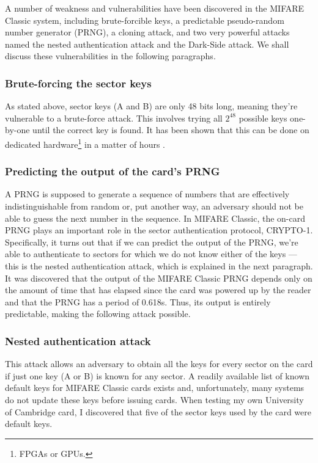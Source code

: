\documentclass[12pt,a4paper,twoside,openright]{report}
\begin{document}
A number of weakness and vulnerabilities have been discovered in the MIFARE Classic system, including brute-forcible keys, a predictable pseudo-random number generator (PRNG), a cloning attack, and two very powerful attacks named the nested authentication attack and the Dark-Side attack. We shall discuss these vulnerabilities in the following paragraphs.

\subsubsection{Brute-forcing the sector keys}

As stated above, sector keys (A and B) are only 48 bits long, meaning they're vulnerable to a brute-force attack. This involves trying all $2^{48}$ possible keys one-by-one until the correct key is found. It has been shown that this can be done on dedicated hardware\footnote{FPGAs or GPUs.} in a matter of hours \cite{mifarebruteforce}.

\subsubsection{Predicting the output of the card's PRNG}

A PRNG is supposed to generate a sequence of numbers that are effectively indistinguishable from random or, put another way, an adversary should not be able to guess the next number in the sequence. In MIFARE Classic, the on-card PRNG plays an important role in the sector authentication protocol, CRYPTO-1. Specifically, it turns out that if we can predict the output of the PRNG, we're able to authenticate to sectors for which we do not know either of the keys --- this is the nested authentication attack, which is explained in the next paragraph. It was discovered that the output of the MIFARE Classic PRNG depends only on the amount of time that has elapsed since the card was powered up by the reader and that the PRNG has a period of 0.618s. Thus, its output is entirely predictable, making the following attack possible.

\subsubsection{Nested authentication attack}

This attack allows an adversary to obtain all the keys for every sector on the card if just one key (A or B) is known for any sector. A readily available list of known default keys for MIFARE Classic cards exists and, unfortunately, many systems do not update these keys before issuing cards. When testing my own University of Cambridge card, I discovered that five of the sector keys used by the card were default keys.
\end{document}
